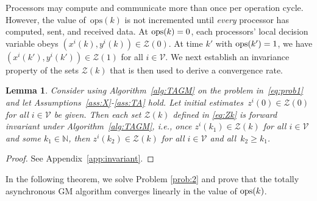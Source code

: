 \documentclass[9pt,shortpaper,twoside,web]{ieeecolor}
\newcommand{\X}{\ensuremath{\mathcal{X}}\xspace}
\newcommand{\Z}{\ensuremath{\mathcal{Z}}\xspace}
\newcommand{\V}{\ensuremath{\mathcal{V}}\xspace}
\newcommand{\ops}[1]{\textnormal{ops}(#1)}
\newcommand{\blue}[1]{{\textcolor{blue}{#1}}}
\newtheorem{lemma}{Lemma}
\begin{document}
Processors may compute and communicate more than once per operation cycle.
However, the value of~$\text{ops}(k)$
is not incremented until \textit{every} processor has computed, sent, and received data. 
At $\ops{k}=0$, each processors' local decision variable obeys $(x^i(k),y^i(k))\in\Z(0)$.
At time $k'$ with $\ops{k'}=1$, we have $(x^i(k'),y^i(k'))\in \Z(1)$ for all $i\in\V$.
We next establish an invariance property of the sets $\Z(k)$ that is then used to derive
a convergence rate. 

\begin{lemma} \label{lem:invariant}
    Consider using Algorithm~\ref{alg:TAGM} on the problem in~\eqref{eq:prob1}
    and let Assumptions~\ref{ass:X}-\ref{ass:TA} hold. 
    Let initial estimates~$z^i(0) \in \Z(0)$ for all $i\in\V$ be given.
    Then each set $\Z(k)$ defined in \eqref{eq:Zk} is forward invariant under Algorithm~\ref{alg:TAGM}, i.e., 
    once $z^i(k_1)\in\Z(k)$ for all $i\in\V$ and some $k_1\in\mathbb N$, then $z^i(k_2)\in\Z(k)$ for all 
    $i \in \V$ and all~$k_2\geq k_1$.
\end{lemma}
\begin{proof}
    See Appendix~\ref{app:invariant}. 
\end{proof}


In the following theorem, we solve Problem \ref{prob:2} and prove that the totally asynchronous GM algorithm converges linearly in the value of $\ops{k}$.
\end{document}
